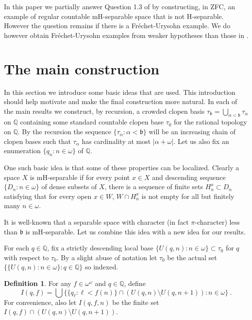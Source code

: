 \documentclass{amsart}
\theoremstyle{definition}
\newtheorem{definition}[thm]{Definition}
\theoremstyle{remark}
\begin{document}
   

In this paper we partially answer Question 1.3 of \cite{BaMaZd} by constructing, in ZFC,
an
example of regular countable  mH-separable space that is not H-separable. However
the question remains if there is a
Fr\'echet-Urysohn example.  We do however obtain Fr\'echet-Urysohn examples from
 weaker hypotheses than those in \cite{BaMaZd}.   


\section{The main construction}


    In this section we introduce
 some basic ideas that are used.  This introduction should help motivate
 and make the final construction more natural. 
 In each of the main results we construct, by recursion, a crowded 
 clopen  basis    $\tau_{\mathfrak b} = \bigcup_{\alpha<
 \mathfrak b}\tau_\alpha
 $ on $\mathbb Q$ containing
 some  standard countable clopen base  $\tau_0$ for the rational
 topology on $\mathbb Q$.  By the recursion the sequence
  $\{\tau_\alpha : \alpha < \mathfrak b\}$ will be an increasing
  chain of clopen bases such that $\tau_\alpha$ has cardinality
  at most $|\alpha+\omega|$. 
 Let us also fix an enumeration
  $\{ q_n : n\in\omega\}$ of $\mathbb Q$.
  
 One such basic idea is that some  of these properties can be localized.
  Clearly a space $X$ is mH-separable if for every point $x\in X$
  and descending sequence $\{ D_n : n\in\omega\}$ of dense subsets of 
   $X$, there is a sequence of finite sets $H^x_n\subset D_n$ satisfying
   that for every  open $x\in W$,
$W\cap H^x_n$ is not empty for all but finitely many $n\in\omega$. 

It is well-known that a  separable space with character (in fact $\pi$-character) 
less than $\mathfrak b$
 is mH-separable. Let us combine this idea with a new idea for our results.
  
 For each $q\in \mathbb Q$, fix a strictly descending
  local base $\{ U(q,n) :n\in \omega\}\subset \tau_0$ for $q$ with respect
  to $\tau_0$. By a slight abuse of notation 
    let $\tau_0$ be the actual set $\{ \{U(q,n):n\in\omega\} : q\in\mathbb Q\}$
    so indexed.
  
  \begin{definition}
  For any $f\in\omega^\omega$
  and $q\in \mathbb Q$, define
  $$I(q,f) = \bigcup 
   \{ \{q_\ell : \ell<f(n)\}\cap \left( U(q,n)\setminus U(q,n{+}1)\right) :
   n\in\omega\}~.$$
   For convenience, also let  $I(q,f,n)$ be 
   the finite set $I(q,f)\cap \left(U(q,n)\setminus U(q,n{+}1)\right)$.
   \end{definition}
\end{document}
